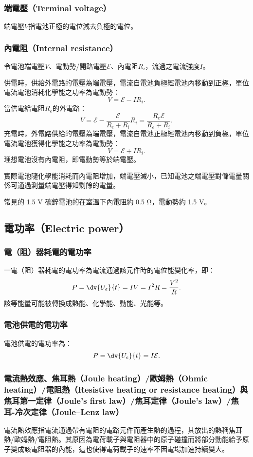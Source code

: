 \documentclass[a4paper,12pt]{report}
\begin{document}
\begin{itemize}
\subsubsection{端電壓（Terminal voltage）}
端電壓$V$指電池正極的電位減去負極的電位。
\subsubsection{內電阻（Internal resistance）}
令電池端電壓$V$、電動勢/開路電壓$\mathcal{E}$、內電阻$R_i$，流過之電流強度$I$。

供電時，供給外電路的電壓為端電壓，電流自電池負極經電池內移動到正極，單位電流電池消耗化學能之功率為電動勢：
\[V=\mathcal{E}-IR_i.\]
當供電給電阻$R_e$的外電路：
\[V=\mathcal{E}-\frac{\mathcal{E}}{R_e+R_i}R_i=\frac{R_e\mathcal{E}}{R_e+R_i}.\]
充電時，外電路供給的電壓為端電壓，電流自電池正極經電池內移動到負極，單位電流電池獲得化學能之功率為電動勢：
\[V=\mathcal{E}+IR_i.\]
理想電池沒有內電阻，即電動勢等於端電壓。

實際電池隨化學能消耗而內電阻增加，端電壓減小，已知電池之端電壓對儲電量關係可通過測量端電壓得知剩餘的電量。

常見的 1.5 V 碳鋅電池的在室溫下內電阻約 0.5 Ω，電動勢約 1.5 V。
\subsection{電功率（Electric power）}
\subsubsection{電（阻）器耗電的電功率}
一電（阻）器耗電的電功率為電流通過該元件時的電位能變化率，即：
\[P=\dv{U_e}{t}=IV=I^2R=\frac{V^2}{R}.\]
該等能量可能被轉換成熱能、化學能、動能、光能等。
\subsubsection{電池供電的電功率}
電池供電的電功率為：
\[P=\dv{U_e}{t}=I\mathcal{E}.\]
\subsubsection{電流熱效應、焦耳熱（Joule heating）/歐姆熱（Ohmic heating）/電阻熱（Resistive heating or resistance heating）與焦耳第一定律（Joule's first law）/焦耳定律（Joule's law）/焦耳-冷次定律（Joule–Lenz law）}
電流熱效應指電流通過帶有電阻的電路元件而產生熱的過程，其放出的熱稱焦耳熱/歐姆熱/電阻熱。其原因為電荷載子與電阻器中的原子碰撞而將部分動能給予原子變成該電阻器的內能，這也使得電荷載子的速率不因電場加速持續變大。


\end{itemize}
\end{document}

